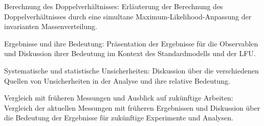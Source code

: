 Berechnung des Doppelverhältnisses: 
Erläuterung der Berechnung des Doppelverhältnisses durch eine simultane 
Maximum-Likelihood-Anpassung der invarianten Massenverteilung.

Ergebnisse und ihre Bedeutung: 
Präsentation der Ergebnisse für die Observablen und Diskussion ihrer 
Bedeutung im Kontext des Standardmodells und der LFU.

Systematische und statistische Unsicherheiten: 
Diskussion über die verschiedenen Quellen von Unsicherheiten in der Analyse 
und ihre relative Bedeutung.

Vergleich mit früheren Messungen und Ausblick auf zukünftige Arbeiten: 
Vergleich der aktuellen Messungen mit früheren Ergebnissen und Diskussion 
über die Bedeutung der Ergebnisse für zukünftige Experimente und Analysen.